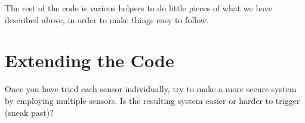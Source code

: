 \documentclass{article}
\begin{document}
The rest of the code is various helpers to do little pieces of what we have described
above, in order to make things easy to follow.

\section{Extending the Code}
Once you have tried each sensor individually, try to make a more secure system by
employing multiple sensors. Is the resulting system easier or harder to trigger
(sneak past)?
\end{document}
